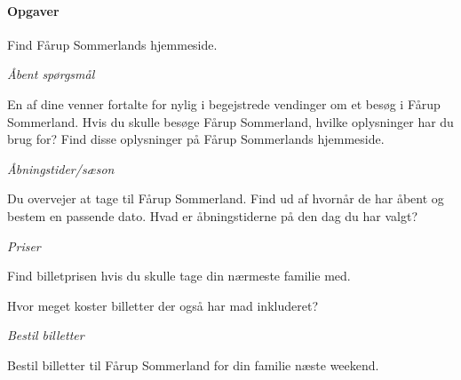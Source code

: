 \documentclass[10pt,a4paper]{article}      %
\begin{document}
\paragraph{Opgaver}
\begin{opgaver}
\item Find Fårup Sommerlands hjemmeside.

\item {\it Åbent spørgsmål}
    \begin{opgaver}
    \item En af dine venner fortalte for nylig i begejstrede vendinger om et
    besøg i Fårup Sommerland. Hvis du skulle besøge Fårup Sommerland, hvilke
    oplysninger har du brug for? Find disse oplysninger på Fårup Sommerlands
    hjemmeside.
    \end{opgaver}

\item {\it Åbningstider/sæson}
    \begin{opgaver}
    \item Du overvejer at tage til Fårup Sommerland. Find ud af hvornår de har
    åbent og bestem en passende dato. Hvad er åbningstiderne på den dag du har
    valgt?
    \end{opgaver}

\item {\it Priser}
    \begin{opgaver}
    \item Find billetprisen hvis du skulle tage din nærmeste familie med.
    \item Hvor meget koster billetter der også har mad inkluderet?  
    \end{opgaver}

\item {\it Bestil billetter}
    \begin{opgaver}
    \item Bestil billetter til Fårup Sommerland for din familie næste weekend.
    \end{opgaver}


\end{opgaver}
\end{document}

